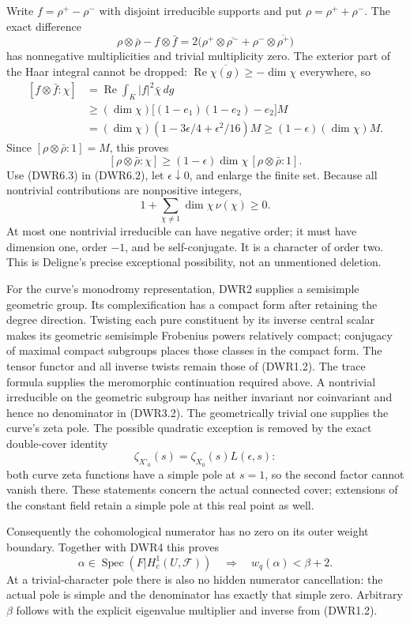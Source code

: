Write \(f=\rho^+-\rho^-\) with disjoint irreducible supports and put
\(\rho=\rho^++\rho^-\). The exact difference \[
\rho\otimes\bar\rho-f\otimes\bar f
=2\bigl(\rho^+\otimes\overline{\rho^-}+\rho^-\otimes\overline{\rho^+}\bigr)
\tag{DWR6.2a}
\] has nonnegative multiplicities and trivial multiplicity zero. The
exterior part of the Haar integral cannot be dropped:
\(\operatorname{Re}\overline{\chi(g)}\ge-\dim\chi\) everywhere, so \[
\begin{aligned}
[f\otimes\bar f:\chi]
&=\operatorname{Re}\int_K|f|^2\bar\chi\,dg\\
&\ge(\dim\chi)\bigl[(1-e_1)(1-e_2)-e_2\bigr]M\\
&=(\dim\chi)(1-3\epsilon/4+\epsilon^2/16)M
\ge(1-\epsilon)(\dim\chi)M.
\end{aligned}
\tag{DWR6.2b}
\] Since \([\rho\otimes\bar\rho:1]=M\), this proves \[
[\rho\otimes\bar\rho:\chi]\ge(1-\epsilon)\dim\chi\,[\rho\otimes\bar\rho:1].
\tag{DWR6.3}
\] Use (DWR6.3) in (DWR6.2), let \(\epsilon\downarrow0\), and enlarge
the finite set. Because all nontrivial contributions are nonpositive
integers, \[
1+\sum_{\chi\ne1}\dim\chi\,\nu(\chi)\ge0.
\tag{DWR6.4}
\] At most one nontrivial irreducible can have negative order; it must
have dimension one, order \(-1\), and be self-conjugate. It is a
character of order two. This is Deligne's precise exceptional
possibility, not an unmentioned deletion.

For the curve's monodromy representation, DWR2 supplies a semisimple
geometric group. Its complexification has a compact form after retaining
the degree direction. Twisting each pure constituent by its inverse
central scalar makes its geometric semisimple Frobenius powers
relatively compact; conjugacy of maximal compact subgroups places those
classes in the compact form. The tensor functor and all inverse twists
remain those of (DWR1.2). The trace formula supplies the meromorphic
continuation required above. A nontrivial irreducible on the geometric
subgroup has neither invariant nor coinvariant and hence no denominator
in (DWR3.2). The geometrically trivial one supplies the curve's zeta
pole. The possible quadratic exception is removed by the exact
double-cover identity \[
\zeta_{X'_0}(s)=\zeta_{X_0}(s)L(\epsilon,s):
\tag{DWR6.5}
\] both curve zeta functions have a simple pole at \(s=1\), so the
second factor cannot vanish there. These statements concern the actual
connected cover; extensions of the constant field retain a simple pole
at this real point as well.

Consequently the cohomological numerator has no zero on its outer weight
boundary. Together with DWR4 this proves \[
\alpha\in\operatorname{Spec}(F|H_c^1(U,\mathcal F))
\quad\Longrightarrow\quad w_q(\alpha)<\beta+2.
\tag{DWR6.6}
\] At a trivial-character pole there is also no hidden numerator
cancellation: the actual pole is simple and the denominator has exactly
that simple zero. Arbitrary \(\beta\) follows with the explicit
eigenvalue multiplier and inverse from (DWR1.2).

